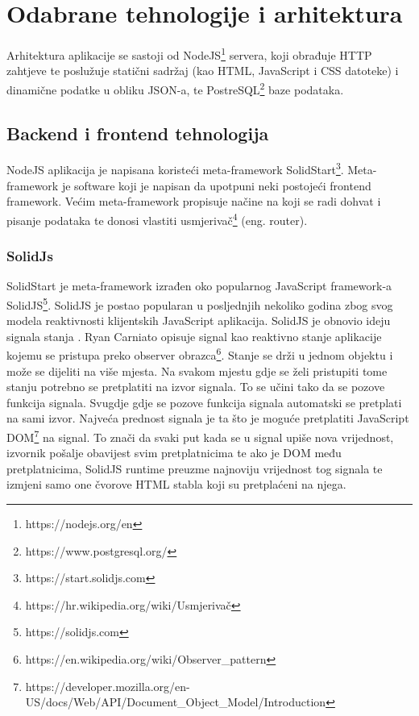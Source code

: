 \documentclass[times, utf8, zavrsni]{fer}
\begin{document}
\chapter{Odabrane tehnologije i arhitektura}

Arhitektura aplikacije se sastoji od NodeJS\footnote{https://nodejs.org/en} servera, koji obrađuje HTTP zahtjeve te poslužuje statični sadržaj (kao HTML, JavaScript i CSS datoteke) i dinamične podatke u obliku JSON-a, te PostreSQL\footnote{https://www.postgresql.org/} baze podataka.

\section{Backend i frontend tehnologija}
NodeJS aplikacija je napisana koristeći meta-framework SolidStart\footnote{https://start.solidjs.com}.
Meta-framework \citep{meta2022davanzo} je software koji je napisan da upotpuni neki postojeći frontend framework.
Većim meta-framework propisuje načine na koji se radi dohvat i pisanje podataka te donosi vlastiti usmjerivač\footnote{https://hr.wikipedia.org/wiki/Usmjerivač} (eng. router).

\subsection{SolidJs}

SolidStart je meta-framework izrađen oko popularnog JavaScript framework-a SolidJS\footnote{https://solidjs.com}.
SolidJS je postao popularan u posljednjih nekoliko godina zbog svog modela reaktivnosti klijentskih JavaScript aplikacija.
SolidJS je obnovio ideju signala stanja \citep{ryan2023signal}.
Ryan Carniato opisuje signal  kao reaktivno stanje aplikacije kojemu se pristupa preko observer obrazca\footnote{https://en.wikipedia.org/wiki/Observer\_pattern}.
Stanje se drži u jednom objektu i može se dijeliti na više mjesta.
Na svakom mjestu gdje se želi pristupiti tome stanju potrebno se pretplatiti na izvor signala. To se učini tako da se pozove funkcija signala.
Svugdje gdje se pozove funkcija signala automatski se pretplati na sami izvor.
Najveća prednost signala je ta što je moguće pretplatiti JavaScript DOM\footnote{https://developer.mozilla.org/en-US/docs/Web/API/Document\_Object\_Model/Introduction} na signal.
To znači da svaki put kada se u signal upiše nova vrijednost, izvornik pošalje obavijest svim pretplatnicima te ako je DOM među pretplatnicima, SolidJS runtime preuzme najnoviju vrijednost tog signala te izmjeni samo
one čvorove HTML stabla koji su pretplaćeni na njega.
\end{document}
